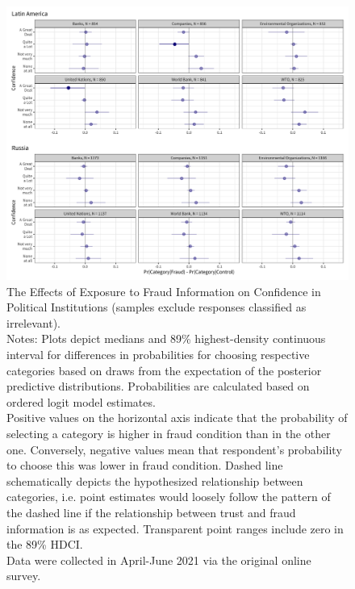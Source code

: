 \documentclass[11pt, ngerman,english,a4]{article}
\begin{document}
\begin{figure}[H]
	\centering
	\includegraphics[width=\linewidth,trim=4 4 4 4,clip]{figs/main_hdi89_6.png}
	\caption{The Effects of Exposure to Fraud Information on Confidence in Political Institutions (samples exclude responses classified as irrelevant).  \\
		\footnotesize{Notes: Plots depict medians and 89\% highest-density continuous interval for differences in probabilities for choosing respective categories based on draws from the expectation of the posterior predictive distributions. Probabilities are calculated based on ordered logit model estimates.\\
			Positive values on the horizontal axis indicate that the probability of selecting a category is higher in fraud condition than in the other one. Conversely, negative values mean that respondent's probability to choose this was lower in fraud condition. Dashed line schematically depicts the hypothesized relationship between categories, i.e. point estimates would loosely follow the pattern of the dashed line if the relationship between trust and fraud information is as expected. Transparent point ranges include zero in the 89\% HDCI.\\
	Data were collected in April-June 2021 via the original online survey. } }
	\singlespacing
	\raggedright
	\label{fig:main-6}
\end{figure}
    
    
\clearpage
\end{document}
